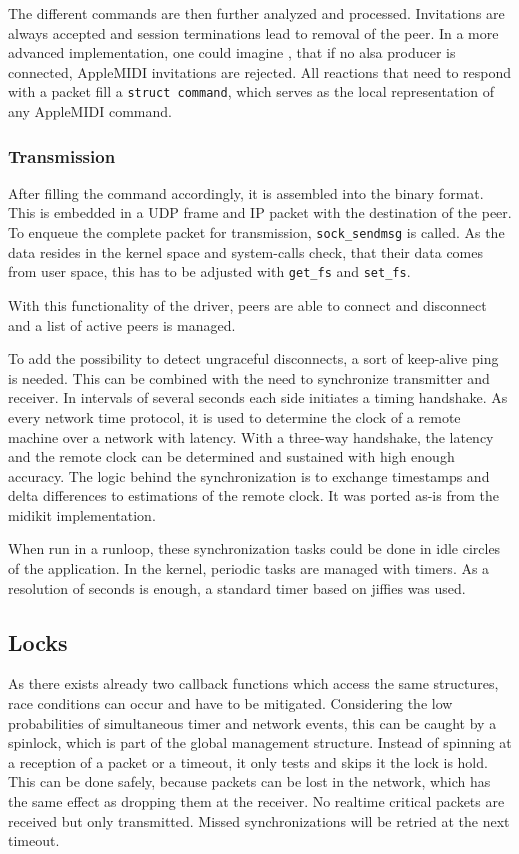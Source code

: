 \documentclass[paper=a4,fontsize=11pt,pagesize,bibtotoc]{scrartcl}
\begin{document}
	The different commands are then further analyzed and processed. Invitations are always accepted and session terminations lead to removal of the peer. In a more advanced implementation, one could imagine , that if no alsa producer is connected, AppleMIDI invitations are rejected. All reactions that need to respond with a packet fill a \texttt{struct command}, which serves as the local representation of any AppleMIDI command.
	
	\subsubsection{Transmission} 
	
	After filling the command accordingly, it is assembled into the binary format. This is embedded in a UDP frame and IP packet with the destination of the peer. To enqueue the complete packet for transmission, \texttt{sock\_sendmsg} is called. As the data resides in the kernel space and system-calls check, that their data comes from user space, this has to be adjusted with \texttt{get\_fs} and \texttt{set\_fs}. 
	
	With this functionality of the driver, peers are able to connect and disconnect and a list of active peers is managed.
	
	To add the possibility to detect ungraceful disconnects, a sort of keep-alive ping is needed. This can be combined with the need to synchronize transmitter and receiver. In intervals of several seconds each side initiates a timing handshake. As every network time protocol, it is used to determine the clock of a remote machine over a network with latency. With a three-way handshake, the latency and the remote clock can be determined and sustained with high enough accuracy.
	The logic behind the synchronization is to exchange timestamps and delta differences to estimations of the remote clock. It was ported as-is from the midikit implementation.
	
	When run in a runloop, these synchronization tasks could be done in idle circles of the application. In the kernel, periodic tasks are managed with timers. As a resolution of seconds is enough, a standard timer based on jiffies was used.
	
	\subsection{Locks}
	
	As there exists already two callback functions which access the same structures, race conditions can occur and have to be mitigated. Considering the low probabilities of simultaneous timer and network events, this can be caught by a spinlock, which is part of the global management structure. Instead of spinning at a reception of a packet or a timeout, it only tests and skips it the lock is hold. This can be done safely, because packets can be lost in the network, which has the same effect as dropping them at the receiver. No realtime critical packets are received but only transmitted. Missed synchronizations will be retried at the next timeout.  
	
\end{document}
